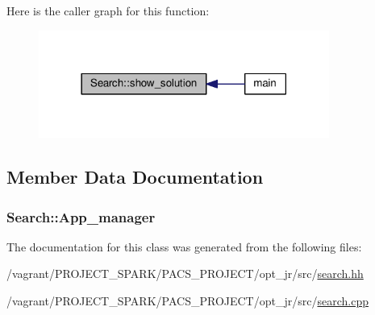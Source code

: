 Here is the caller graph for this function\-:\nopagebreak
\begin{figure}[H]
\begin{center}
\leavevmode
\includegraphics[width=270pt]{classSearch_a421161ac4a63ea88eb86832395e32ab5_icgraph}
\end{center}
\end{figure}




\subsection{Member Data Documentation}
\hypertarget{classSearch_aa5f2a65e5b640dec221284069963b91a}{
\subsubsection[{App\-\_\-manager}]{ Search\-::\-App\-\_\-manager\hspace{0.3cm}{\ttfamily [private]}}}\label{classSearch_aa5f2a65e5b640dec221284069963b91a}


The documentation for this class was generated from the following files\-:\begin{DoxyCompactItemize}
\item 
/vagrant/\-P\-R\-O\-J\-E\-C\-T\-\_\-\-S\-P\-A\-R\-K/\-P\-A\-C\-S\-\_\-\-P\-R\-O\-J\-E\-C\-T/opt\-\_\-jr/src/\hyperlink{search_8hh}{search.\-hh}\item 
/vagrant/\-P\-R\-O\-J\-E\-C\-T\-\_\-\-S\-P\-A\-R\-K/\-P\-A\-C\-S\-\_\-\-P\-R\-O\-J\-E\-C\-T/opt\-\_\-jr/src/\hyperlink{search_8cpp}{search.\-cpp}\end{DoxyCompactItemize}
